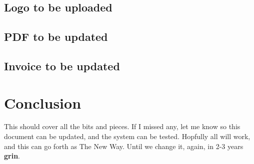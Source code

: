 \documentclass[captions=tablesignature]{scrartcl}
\begin{document}
\subsection{Logo to be uploaded}
\label{sec-4-1}
\subsection{PDF to be updated}
\label{sec-4-2}
\subsection{Invoice to be updated}
\label{sec-4-3}

\section{Conclusion}
\label{sec-5}
This should cover all the bits and pieces.  If I missed any, let me
know so this document can be updated, and the system can be tested.
Hopfully all will work, and this can go forth as The New Way.  Until
we change it, again, in 2-3 years \textbf{grin}.
\end{document}
